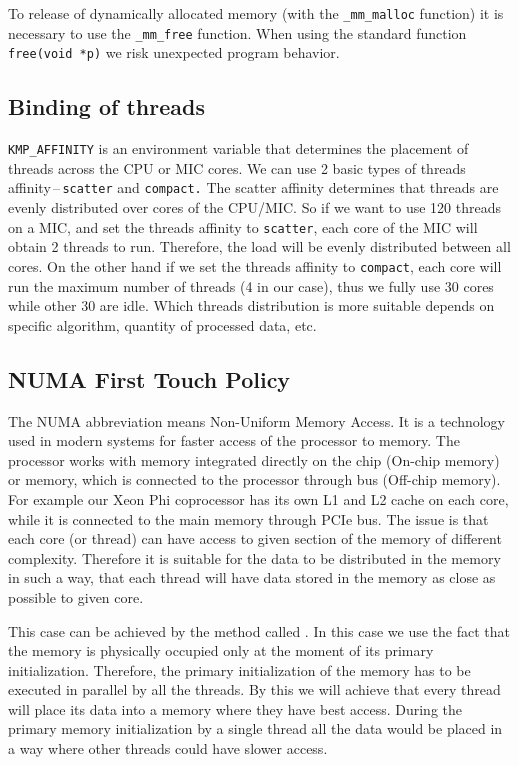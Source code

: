 \par To release of dynamically allocated memory (with the \texttt{\_mm\_malloc} function) it is necessary to use the \texttt{\_mm\_free} function. When using the standard function \texttt{free(void *p)} we risk unexpected program behavior.

\subsection{Binding of threads}
\texttt{KMP\_AFFINITY} is an environment variable that determines the placement of threads across the CPU or MIC cores. We can use 2 basic types of threads affinity\,--\,\texttt{scatter} and \texttt{compact.} The scatter affinity determines that threads are evenly distributed over cores of the CPU/MIC. So if we want to use 120 threads on a MIC, and set the threads affinity to \texttt{scatter}, each core of the MIC will obtain 2 threads to run. Therefore, the load will be evenly distributed between all cores. On the other hand if we set the threads affinity to \texttt{compact}, each core will run the maximum number of threads (4 in our case), thus we fully use 30 cores while other 30 are idle. Which threads distribution is more suitable depends on specific algorithm, quantity of processed data, etc.

\subsection{NUMA First Touch Policy}
The NUMA abbreviation means Non-Uniform Memory Access. It is a technology used in modern systems for faster access of the processor to memory. The processor works with memory integrated directly on the chip (On-chip memory) or memory, which is connected to the processor through bus (Off-chip memory). For example our Xeon Phi coprocessor has its own L1 and L2 cache on each core, while it is connected to the main memory through PCIe bus. The issue is that each core (or thread) can have access to given section of the memory of different complexity. Therefore it is suitable for the data to be distributed in the memory in such a way, that each thread will have data stored in the memory as close as possible to given core.

\par This case can be achieved by the method called . In this case we use the fact that the memory is physically occupied only at the moment of its primary initialization. Therefore, the primary initialization of the memory has to be executed in parallel by all the threads. By this we will achieve that every thread will place its data into a memory where they have best access. During the primary memory initialization by a single thread all the data would be placed in a way where other threads could have slower access.

